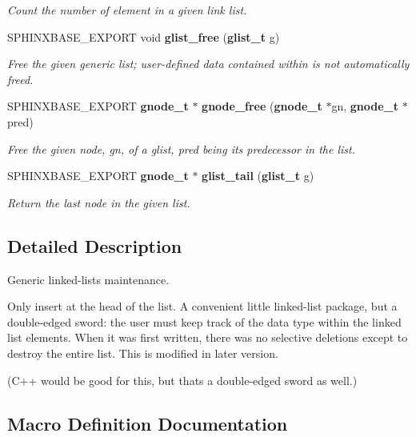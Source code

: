 \begin{DoxyCompactItemize}
\begin{DoxyCompactList}\small\item\em Count the number of element in a given link list. \end{DoxyCompactList}\item 
S\+P\+H\+I\+N\+X\+B\+A\+S\+E\+\_\+\+E\+X\+P\+O\+R\+T void {\bf glist\+\_\+free} ({\bf glist\+\_\+t} g)
\begin{DoxyCompactList}\small\item\em Free the given generic list; user-\/defined data contained within is not automatically freed. \end{DoxyCompactList}\item 
S\+P\+H\+I\+N\+X\+B\+A\+S\+E\+\_\+\+E\+X\+P\+O\+R\+T {\bf gnode\+\_\+t} $\ast$ {\bf gnode\+\_\+free} ({\bf gnode\+\_\+t} $\ast$gn, {\bf gnode\+\_\+t} $\ast$pred)
\begin{DoxyCompactList}\small\item\em Free the given node, gn, of a glist, pred being its predecessor in the list. \end{DoxyCompactList}\item 
S\+P\+H\+I\+N\+X\+B\+A\+S\+E\+\_\+\+E\+X\+P\+O\+R\+T {\bf gnode\+\_\+t} $\ast$ {\bf glist\+\_\+tail} ({\bf glist\+\_\+t} g)\label{glist_8h_a6921d6b8b11cb9e05fadeaa091e89234}

\begin{DoxyCompactList}\small\item\em Return the last node in the given list. \end{DoxyCompactList}\end{DoxyCompactItemize}


\subsection{Detailed Description}
Generic linked-\/lists maintenance. 

Only insert at the head of the list. A convenient little linked-\/list package, but a double-\/edged sword\+: the user must keep track of the data type within the linked list elements. When it was first written, there was no selective deletions except to destroy the entire list. This is modified in later version.

(C++ would be good for this, but that\textquotesingle{}s a double-\/edged sword as well.) 

\subsection{Macro Definition Documentation}
